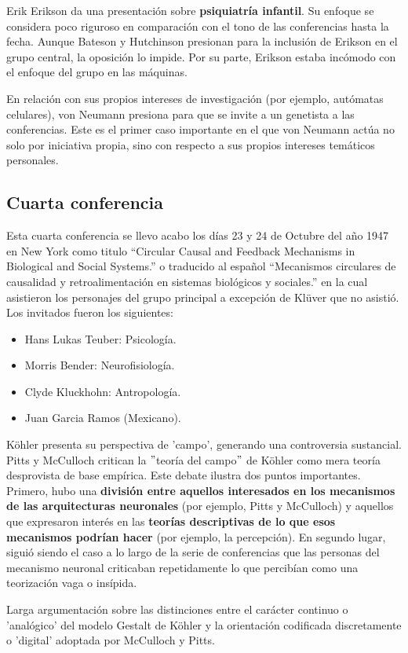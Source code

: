 \documentclass[11pt]{article}
\begin{document}
		Erik Erikson da una presentación sobre \textbf{psiquiatría infantil}. Su enfoque se considera poco riguroso en comparación con el tono de las conferencias hasta la fecha. Aunque Bateson y Hutchinson presionan para la inclusión de Erikson en el grupo central, la oposición lo impide. Por su parte, Erikson estaba incómodo con el enfoque del grupo en las máquinas.\par

		En relación con sus propios intereses de investigación (por ejemplo, autómatas celulares), von Neumann presiona para que se invite a un genetista a las conferencias. Este es el primer caso importante en el que von Neumann actúa no solo por iniciativa propia, sino con respecto a sus propios intereses temáticos personales.
 		
 		\subsection{Cuarta conferencia}
		Esta cuarta conferencia se llevo acabo los días 23 y 24 de Octubre del año 1947 en New York como titulo ``Circular Causal and Feedback Mechanisms in Biological and Social Systems.'' o traducido al español ``Mecanismos circulares de causalidad y retroalimentación en sistemas biológicos y sociales.'' en la cual asistieron los personajes del grupo principal a excepción de Klüver que no asistió. Los invitados fueron los siguientes:
		\begin{itemize}
			\item Hans Lukas Teuber: Psicología.
    		\item Morris Bender: Neurofisiología.
    		\item Clyde Kluckhohn: Antropología.
    		\item Juan Garcia Ramos (Mexicano).
		\end{itemize}
		Köhler presenta su perspectiva de 'campo', generando una controversia sustancial. Pitts y McCulloch critican la $"$teoría del campo$"$ de Köhler como mera teoría desprovista de base empírica.
Este debate ilustra dos puntos importantes. Primero, hubo una \textbf{división entre aquellos interesados en los mecanismos de las arquitecturas neuronales} (por ejemplo, Pitts y McCulloch) y aquellos que expresaron interés en las \textbf{teorías descriptivas de lo que esos mecanismos podrían hacer} (por ejemplo, la percepción). En segundo lugar, siguió siendo el caso a lo largo de la serie de conferencias que las personas del mecanismo neuronal criticaban repetidamente lo que percibían como una teorización vaga o insípida.\par
		Larga argumentación sobre las distinciones entre el carácter continuo o 'analógico' del modelo Gestalt de Köhler y la orientación codificada discretamente o 'digital' adoptada por McCulloch y Pitts.
\end{document}
